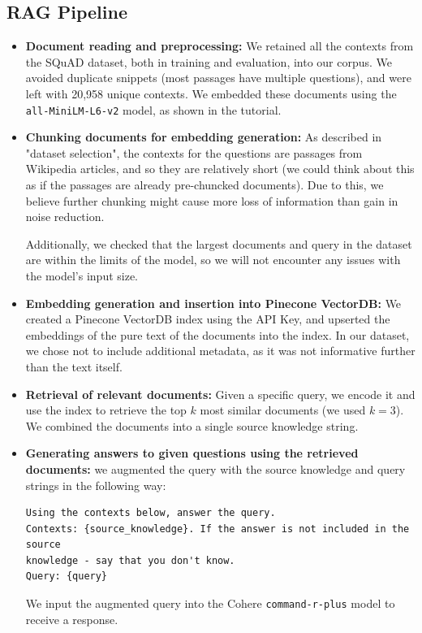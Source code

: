 \documentclass[12pt]{article}
\begin{document}
\subsection{RAG Pipeline}

\begin{itemize}
    \item \textbf{Document reading and preprocessing:} We retained all the contexts from the SQuAD dataset, both in training and evaluation, into our corpus. We avoided duplicate snippets (most passages have multiple questions), and were left with 20,958 unique contexts.
    We embedded these documents using the \texttt{all-MiniLM-L6-v2} model, as shown in the tutorial.
    
    \item \textbf{Chunking documents for embedding generation:} As described in "dataset selection", the contexts for the questions are passages from Wikipedia articles, and so they are relatively short (we could think about this as if the passages are already pre-chuncked documents).
    Due to this, we believe further chunking might cause more loss of information than gain in noise reduction.
    
    Additionally, we checked that the largest documents and query in the dataset are within the limits of the model, so we will not encounter any issues with the model's input size.

    \item \textbf{Embedding generation and insertion into Pinecone VectorDB:} We created a Pinecone VectorDB index using the API Key, and upserted the embeddings of the pure text of the documents into the index. 
    In our dataset, we chose not to include additional metadata, as it was not informative further than the text itself.
    
    \item \textbf{Retrieval of relevant documents:} Given a specific query, we encode it and use the index to retrieve the top $k$ most similar documents (we used $k=3$). We combined the documents into a single source knowledge string.

    \item \textbf{Generating answers to given questions using the retrieved documents:} we augmented the query with the source knowledge and query strings in the following way:

\begin{verbatim}
Using the contexts below, answer the query.
Contexts: {source_knowledge}. If the answer is not included in the source 
knowledge - say that you don't know.
Query: {query}
\end{verbatim}

    We input the augmented query into the Cohere \texttt{command-r-plus} model to receive a response.

\end{itemize}
\end{document}
